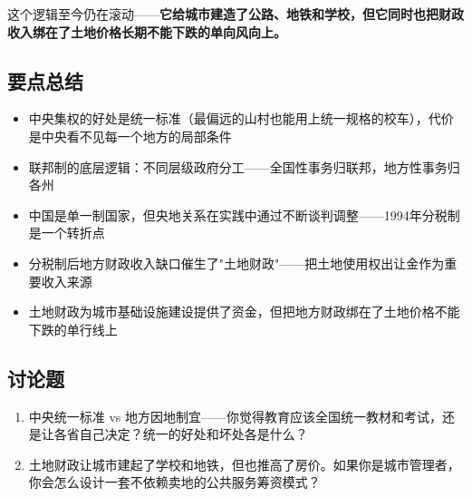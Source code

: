 \documentclass[a4paper,12pt]{ctexart}
\begin{document}
这个逻辑至今仍在滚动——\textbf{它给城市建造了公路、地铁和学校，但它同时也把财政收入绑在了土地价格长期不能下跌的单向风向上。}


\subsection*{要点总结}
\begin{itemize}
  \item 中央集权的好处是统一标准（最偏远的山村也能用上统一规格的校车），代价是中央看不见每一个地方的局部条件
  \item 联邦制的底层逻辑：不同层级政府分工——全国性事务归联邦，地方性事务归各州
  \item 中国是单一制国家，但央地关系在实践中通过不断谈判调整——1994年分税制是一个转折点
  \item 分税制后地方财政收入缺口催生了"土地财政"——把土地使用权出让金作为重要收入来源
  \item 土地财政为城市基础设施建设提供了资金，但把地方财政绑在了土地价格不能下跌的单行线上
\end{itemize}

\subsection*{讨论题}
\begin{enumerate}
  \item 中央统一标准 vs 地方因地制宜——你觉得教育应该全国统一教材和考试，还是让各省自己决定？统一的好处和坏处各是什么？
  \item 土地财政让城市建起了学校和地铁，但也推高了房价。如果你是城市管理者，你会怎么设计一套不依赖卖地的公共服务筹资模式？
\end{enumerate}
\end{document}
